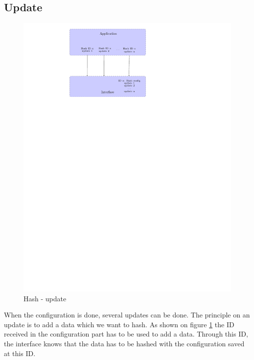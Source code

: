\subsection*{Update}
\begin{figure}[!ht]
\centering
\includegraphics[trim=8cm 20cm 9.5cm 0cm]{figures/hash_example_update.pdf}
\caption{Hash - update\newline}
\label{fig:gci_hash_update}
\end{figure}
When the configuration is done, several updates can be done.\newline
The principle on an update is to add a data which we want to hash.\newline
As shown on figure \ref{fig:gci_hash_update} the ID received in the
configuration part has to be used to add a data.\newline
Through this ID, the interface knows that the data has to be hashed with the
configuration saved at this ID.\newline
\newpage
